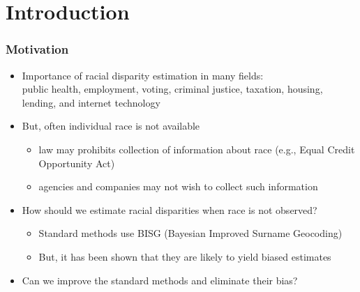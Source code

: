 \documentclass[handout]{beamer}
\title[]{\tit}
\institute[Harvard]{\large Harvard University }
\date{Federal Deposit Insurance Corportaion\\
  April 12, 2023 \\  \vspace{.25in} Joint work with
  Cory McCartan, Jacob Goldin, and Daniel E. Ho }
\author[Kosuke Imai]{\large Kosuke Imai }
\begin{document}
\frame{\titlepage}



\section{Introduction}

\begin{frame}

  \frametitle{Motivation}

  \begin{itemize}
  \item Importance of racial disparity estimation in many fields:\\
    public health, employment, voting, criminal justice, taxation,
    housing, lending, and internet technology

    \vfill
  \item But, often individual race is not available
    \begin{itemize}
    \item law may prohibits collection of information about race
      (e.g., Equal Credit Opportunity Act)
    \item agencies and companies may not wish to collect such information
    \end{itemize}
    \vfill
  \item How should we estimate racial disparities when race is not
    observed?
    \begin{itemize}
    \item Standard methods use BISG (Bayesian Improved Surname
      Geocoding)
    \item But, it has been shown that they are likely to yield biased estimates
    \end{itemize}

  \item Can we improve the standard methods and eliminate their bias? 
  \end{itemize}

\end{frame}
\end{document}

